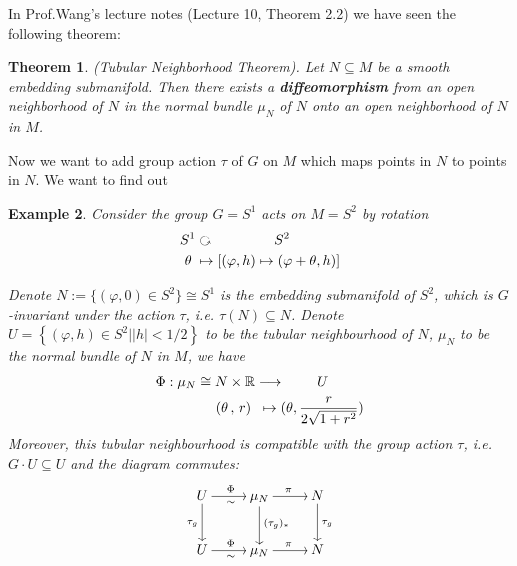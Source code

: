 \documentclass[reqno,11pt]{amsart}
\numberwithin{equation}{section}
\theoremstyle{plain}
\newtheorem{theorem}{Theorem}[section]
\newtheorem{eg}[theorem]{Example}
\theoremstyle{plain}
\numberwithin{equation}{section}
\theoremstyle{remark}
\begin{document}
In Prof.Wang's lecture notes \cite{ZW1} (Lecture 10, Theorem 2.2) we have seen the following theorem:
\begin{theorem}\label{thm:main}
	(Tubular Neighborhood Theorem). Let $N \subseteq M$ be a smooth embedding submanifold.
	Then there exists a \textbf{diffeomorphism} from an open neighborhood of $N$ in the normal bundle $\mu_N$ of $N$ onto an open neighborhood of $N$ in $M$.
\end{theorem}
  Now we want to add group action $\tau$ of $G$ on $M$ which maps points in $N$ to points in $N$. We want to find out
  \begin{center}
  \end{center} 
\begin{eg}
	Consider the group $G=S^1$ acts on $M=S^2$ by rotation
	\begin{equation*}
	\begin{aligned}
		S^1 &\text{ \rotatebox[origin=c]{270}{$\circlearrowleft$} }\hspace{1.5cm} S^2\\
		\theta\; &\mapsto [(\varphi,h)\mapsto(\varphi+\theta,h)]
	\end{aligned}
	\end{equation*}
	
Denote $N:=\{(\varphi,0) \in S^2\} \cong S^1$ is the embedding submanifold of $S^2$, which is $G$-invariant under the action $\tau$, i.e.
$\tau (N) \subseteq N$.
Denote $U=\left\{(\varphi,h)\in S^2 \big| |h| < 1/2\right\}$ to be the tubular neighbourhood of $N$, $\mu_N$ to be the normal bundle of $N$ in $M$, we have
	\begin{equation*}
	\begin{aligned}
	\Phi:\mu_N \cong N \times \mathbb{R} &\longrightarrow \hspace{0.8cm} U\\
	(\theta\,,\,r)\; &\;\mapsto (\theta,\frac{r}{2\sqrt{1+r^2}})
	\end{aligned}
	\end{equation*}
	Moreover, this tubular neighbourhood is compatible with the group action $\tau$, i.e. $G \cdot U \subseteq U$ and the diagram commutes:
\begin{equation*}
	\SelectTips{eu}{12}
		\xymatrix{
		U\ar[r]_{\sim}^{\Phi}\ar[d]_{\tau_g} & \mu_N\ar[r]^{\pi}\ar[d]^{(\tau_g)_*} & N\ar[d]^{\tau_g} \\
		U\ar[r]_{\sim}^{\Phi} & \mu_N\ar[r]^{\pi} & N	
	}
\end{equation*}
\end{eg}
\end{document}
